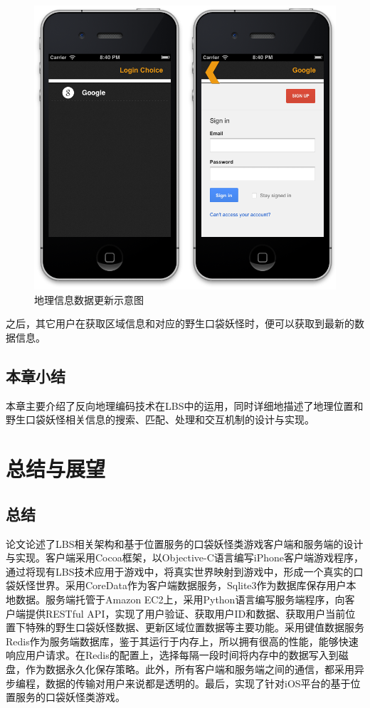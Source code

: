 \documentclass{article}
\begin{document}
\begin{CJK}{UTF8}{gbsn}
  \begin{figure}[htbp]
		\centering
		\includegraphics[bb=0 0 548 341, scale=0.45]{figure/fig_n21.png}
		\caption{地理信息数据更新示意图}
		\label{fig:n21}
	\end{figure}

  之后，其它用户在获取区域信息和对应的野生口袋妖怪时，便可以获取到最新的数据信息。

	\subsection{本章小结}
  本章主要介绍了反向地理编码技术在LBS中的运用，同时详细地描述了地理位置和野生口袋妖怪相关信息的搜索、匹配、处理和交互机制的设计与实现。


	\section{总结与展望}
	\subsection{总结}
  论文论述了LBS相关架构和基于位置服务的口袋妖怪类游戏客户端和服务端的设计与实现。客户端采用Cocoa框架，以Objective-C语言编写iPhone客户端游戏程序，通过将现有LBS技术应用于游戏中，将真实世界映射到游戏中，形成一个真实的口袋妖怪世界。采用CoreData作为客户端数据服务，Sqlite3作为数据库保存用户本地数据。服务端托管于Amazon EC2上，采用Python语言编写服务端程序，向客户端提供RESTful API，实现了用户验证、获取用户ID和数据、获取用户当前位置下特殊的野生口袋妖怪数据、更新区域位置数据等主要功能。采用键值数据服务Redis作为服务端数据库，鉴于其运行于内存上，所以拥有很高的性能，能够快速响应用户请求。在Redis的配置上，选择每隔一段时间将内存中的数据写入到磁盘，作为数据永久化保存策略。此外，所有客户端和服务端之间的通信，都采用异步编程，数据的传输对用户来说都是透明的。最后，实现了针对iOS平台的基于位置服务的口袋妖怪类游戏。


\end{CJK}
\end{document}

